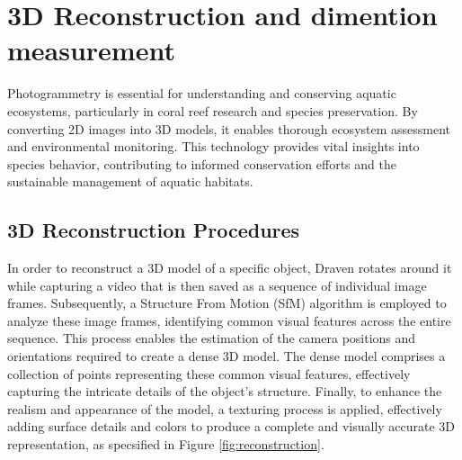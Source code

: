 \documentclass{article}
\begin{document}
\section*{3D Reconstruction and dimention measurement}
Photogrammetry is essential for understanding and conserving aquatic ecosystems, particularly in coral reef research and species preservation. By converting 2D images into 3D models, it enables thorough ecosystem assessment and environmental monitoring. This technology provides vital insights into species behavior, contributing to informed conservation efforts and the sustainable management of aquatic habitats.

\subsection*{3D Reconstruction Procedures}
In order to reconstruct a 3D model of a specific object, Draven rotates around it while capturing a video that is then saved as a sequence of individual image frames. Subsequently, a Structure From Motion (SfM) algorithm is employed to analyze these image frames, identifying common visual features across the entire sequence. This process enables the estimation of the camera positions and orientations required to create a dense 3D model. The dense model comprises a collection of points representing these common visual features, effectively capturing the intricate details of the object's structure. Finally, to enhance the realism and appearance of the model, a texturing process is applied, effectively adding surface details and colors to produce a complete and visually accurate 3D representation, as specsified in Figure \ref{fig:reconstruction}.
\end{document}
